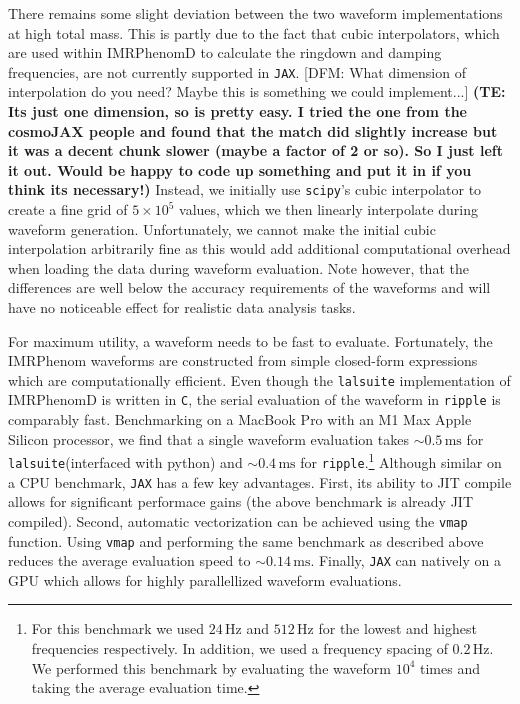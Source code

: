 \documentclass[twocolumn]{aastex631}
\newcommand{\jax}{\texttt{JAX}\xspace}
\newcommand{\ripple}{\texttt{ripple}\xspace}
\newcommand{\lalsuite}{\texttt{lalsuite}\xspace}
\newcommand{\te}[1]{\textbf{\color{pyGreen}(TE: #1)}}
\newcommand{\dfm}[1]{{\color{dfm}[DFM: #1]}}
\begin{document}
There remains some slight deviation between the two waveform implementations at high total mass. 
This is partly due to the fact that cubic interpolators, which are used within IMRPhenomD to calculate the ringdown and damping frequencies, are not currently supported in \jax. \dfm{What dimension of interpolation do you need? Maybe this is something we could implement...}
\te{Its just one dimension, so is pretty easy. I tried the one from the cosmoJAX people and found that the match did slightly increase but it was a decent chunk slower (maybe a factor of 2 or so). So I just left it out. Would be happy to code up something and put it in if you think its necessary!}
Instead, we initially use \texttt{scipy}'s cubic interpolator to create a fine grid of $5\times10^5$ values, which we then linearly interpolate during waveform generation.
Unfortunately, we cannot make the initial cubic interpolation arbitrarily fine as this would add additional computational overhead when loading the data during waveform evaluation.
Note however, that the differences are well below the accuracy requirements of the waveforms and will have no noticeable effect for realistic data analysis tasks.

For maximum utility, a waveform needs to be fast to evaluate.
Fortunately, the IMRPhenom waveforms are constructed from simple closed-form expressions which are computationally efficient.
Even though the \lalsuite implementation of IMRPhenomD is written in \texttt{C}, the serial evaluation of the waveform in \ripple is comparably fast. 
Benchmarking on a MacBook Pro with an M1 Max Apple Silicon processor, we find that a single waveform evaluation takes $\sim 0.5\,\mathrm{ms}$ for \lalsuite (interfaced with python) and $\sim 0.4\,\mathrm{ms}$ for \ripple.\footnote{
    For this benchmark we used $24\,\mathrm{Hz}$ and $512\,\mathrm{Hz}$ for the lowest and highest frequencies respectively. 
    In addition, we used a frequency spacing of $0.2\,\mathrm{Hz}$. 
    We performed this benchmark by evaluating the waveform $10^{4}$ times and taking the average evaluation time.
}
Although similar on a CPU benchmark, \jax has a few key advantages. 
First, its ability to JIT compile allows for significant performace gains (the above benchmark is already JIT compiled).
Second, automatic vectorization can be achieved using the \texttt{vmap} function.
Using \texttt{vmap} and performing the same benchmark as described above reduces the average evaluation speed to $\sim 0.14\,\mathrm{ms}$.
Finally, \jax can natively on a GPU which allows for highly parallellized waveform evaluations.
\end{document}
